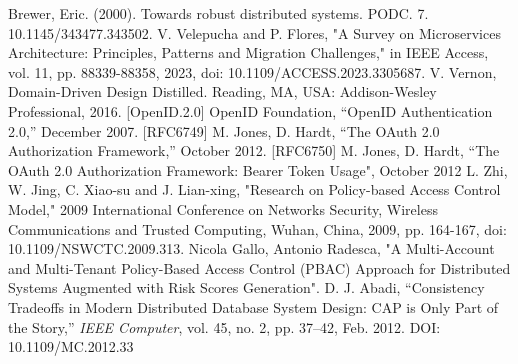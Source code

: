 \documentclass[letterpaper, 10 pt, conference]{ieeeconf}  %
\begin{document}
\addtolength{\textheight}{-12cm}   %


\begin{thebibliography}{99}
 Brewer, Eric. (2000). Towards robust distributed systems. PODC. 7. 10.1145/343477.343502. 
 V. Velepucha and P. Flores, "A Survey on Microservices Architecture: Principles, Patterns and Migration Challenges," in IEEE Access, vol. 11, pp. 88339-88358, 2023, doi: 10.1109/ACCESS.2023.3305687.
 V. Vernon, Domain-Driven Design Distilled. Reading, MA, USA: Addison-Wesley Professional, 2016.
 [OpenID.2.0] OpenID Foundation, “OpenID Authentication 2.0,” December 2007.
 [RFC6749]	M. Jones, D. Hardt, “The OAuth 2.0 Authorization Framework,” October 2012.
 [RFC6750]	M. Jones, D. Hardt, “The OAuth 2.0 Authorization Framework: Bearer Token Usage", October 2012
 L. Zhi, W. Jing, C. Xiao-su and J. Lian-xing, "Research on Policy-based Access Control Model," 2009 International Conference on Networks Security, Wireless Communications and Trusted Computing, Wuhan, China, 2009, pp. 164-167, doi: 10.1109/NSWCTC.2009.313.
 Nicola Gallo, Antonio Radesca, "A Multi-Account and Multi-Tenant Policy-Based Access Control (PBAC) Approach for Distributed Systems Augmented with Risk Scores Generation".
 D. J. Abadi, “Consistency Tradeoffs in Modern Distributed Database System Design: CAP is Only Part of the Story,” \emph{IEEE Computer}, vol. 45, no. 2, pp. 37–42, Feb. 2012. DOI: 10.1109/MC.2012.33
\end{thebibliography}
\end{document}
